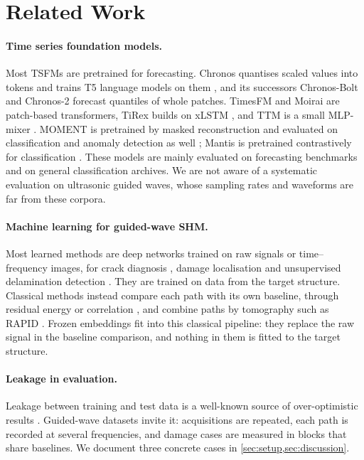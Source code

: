 \documentclass{article}
\begin{document}
\section{Related Work}
\label{sec:related}

\paragraph{Time series foundation models.}
Most TSFMs are pretrained for forecasting. Chronos quantises scaled values into tokens and trains T5
language models on them \citep{ansari2024chronos}, and its successors Chronos-Bolt and Chronos-2
\citep{ansari2025chronos2} forecast quantiles of whole patches. TimesFM \citep{das2024timesfm} and Moirai
\citep{woo2024moirai} are patch-based transformers, TiRex builds on xLSTM \citep{auer2025tirex}, and TTM
is a small MLP-mixer \citep{ekambaram2024ttm}. MOMENT is pretrained by masked reconstruction and evaluated
on classification and anomaly detection as well \citep{goswami2024moment}; Mantis is pretrained
contrastively for classification \citep{feofanov2026mantis}. These models are mainly evaluated on
forecasting benchmarks and on general classification archives. We are not aware of a systematic
evaluation on ultrasonic guided waves, whose sampling rates and waveforms are far from these corpora.

\paragraph{Machine learning for guided-wave SHM.}
Most learned methods are deep networks trained on raw signals or time--frequency images, for crack
diagnosis \citep{xu2019crack}, damage localisation \citep{rautela2021combined,henkmann2025tinyml} and
unsupervised delamination detection \citep{rautela2022delamination,guo2025dcat}. They are trained on data
from the target structure. Classical methods instead compare each path with its own baseline, through
residual energy or correlation \citep{croxford2007strategies}, and combine paths by tomography such as
RAPID \citep{hay2006rapid}. Frozen embeddings fit into this classical pipeline: they replace the raw
signal in the baseline comparison, and nothing in them is fitted to the target structure.

\paragraph{Leakage in evaluation.}
Leakage between training and test data is a well-known source of over-optimistic results
\citep{kaufman2012leakage,kapoor2023leakage}. Guided-wave datasets invite it: acquisitions are repeated,
each path is recorded at several frequencies, and damage cases are measured in blocks that share
baselines. We document three concrete cases in \cref{sec:setup,sec:discussion}.
\end{document}
